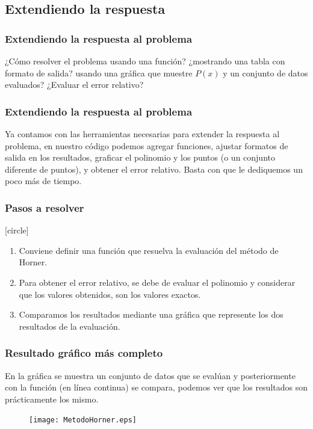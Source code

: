 \subsection{Extendiendo la respuesta}
\begin{frame}
\frametitle{Extendiendo la respuesta al problema}
¿Cómo resolver el problema usando una función? ¿mostrando una tabla con formato de salida? usando una gráfica que muestre $P(x)$ y un conjunto de datos evaluados? ¿Evaluar el error relativo?
\end{frame}
\begin{frame}
\frametitle{Extendiendo la respuesta al problema}
Ya contamos con las herramientas necesarias para extender la respuesta al problema, en nuestro código podemos agregar funciones, ajustar formatos de salida en los resultados, graficar el polinomio y los puntos (o un conjunto diferente de puntos), y obtener el error relativo. Basta con que le dediquemos un poco más de tiempo.
\end{frame}
\begin{frame}
\frametitle{Pasos a resolver}
[circle]
\begin{enumerate}[<+->]
\item Conviene definir una función que resuelva la evaluación del método de Horner.
\item Para obtener el error relativo, se debe de evaluar el polinomio y considerar que los valores obtenidos, son los valores exactos.
\item Comparamos los resultados mediante una gráfica que represente los dos resultados de la evaluación.
\end{enumerate}
\end{frame}
\begin{frame}[fragile]
\frametitle{Resultado gráfico más completo}
En la gráfica se muestra un conjunto de datos que se evalúan y posteriormente con la función (en línea continua) se compara, podemos ver que los resultados son prácticamente los mismo.
\begin{figure}
	\centering
	\texttt{[image: MetodoHorner.eps]} 
\end{figure}
\end{frame}
